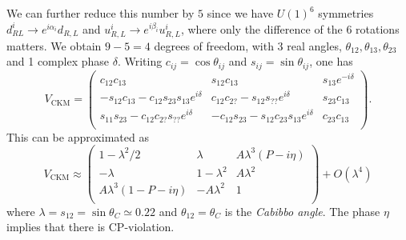 We can further reduce this number by $5$ since we have $U(1)^6$ symmetries $d^{i}_{R L} \to e^{i \alpha_i} d_{R, L}$ and $u^{i}_{R, L} \to e^{i \beta_i} u_{R, L}^{i}$, where only the difference of the 6 rotations matters.
We obtain $9 -5 = 4$ degrees of freedom, with $3$ real angles, $\theta_{12}, \theta_{13}, \theta_{23}$ and 1 complex phase $\delta$.
Writing $c_{ij} = \cos \theta_{ij}$ and $s_{ij} = \sin \theta_{ij}$, one has
\begin{equation}
  \label{eq:20-ckm}
  V_{\text{CKM}} = 
  \begin{pmatrix}
   c_{12} c_{13} & s_{12} c_{13} & s_{13} e^{-i \delta} \\
   -s_{12} c_{13} - c_{12} s_{23} s_{13} e^{i \delta} & c_{12} c_{2?} -s_{12} s_{??} e^{i \delta} & s_{23} c_{13} \\
   s_{11} s_{23} - c_{12} c_{2?} s_{??} e^{i \delta} & -c_{12} s_{23} - s_{12} c_{23} s_{13} e^{i \delta} & c_{23} c_{13} \\
  \end{pmatrix}.
\end{equation}
This can be approximated as
\begin{equation}
  V_{\text{CKM}} \approx
  \begin{pmatrix}
    1 - \lambda^2 / 2 & \lambda & A \lambda^3 (P - i \eta) \\
   -\lambda & 1 - \lambda^2 & A \lambda^2 \\
   A \lambda^3 (1 - P - i \eta) & -A \lambda^2 & 1 \\
 \end{pmatrix} + O(\lambda^4)
\end{equation}
where $\lambda = s_{12} = \sin \theta_C \simeq 0.22$ and $\theta_{12} = \theta_C$ is the \emph{Cabibbo angle}.
The phase $\eta$ implies that there is CP-violation.

